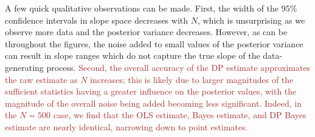 \documentclass[11pt,conference]{IEEEtran}
\begin{document}
A few quick qualitative observations can be made. First, the width of the $95\%$ confidence intervals in slope space decreases with $N$, which is unsurprising as we observe more data and the posterior variance decreases. However, as can be throughout the figures, the noise added to small values of the posterior variance can result in slope ranges which do not capture the true slope of the data-generating process. \textcolor{brown}{Second, the overall accuracy of the DP estimate approximates the raw estimate as $N$ increases; this is likely due to larger magnitudes of the sufficient statistics having a greater influence on the posterior values, with the magnitude of the overall noise being added becoming less significant. Indeed, in the $N=500$ case, we find that the OLS estimate, Bayes estimate, and DP Bayes estimate are nearly identical, narrowing down to point estimates.}
\end{document}
